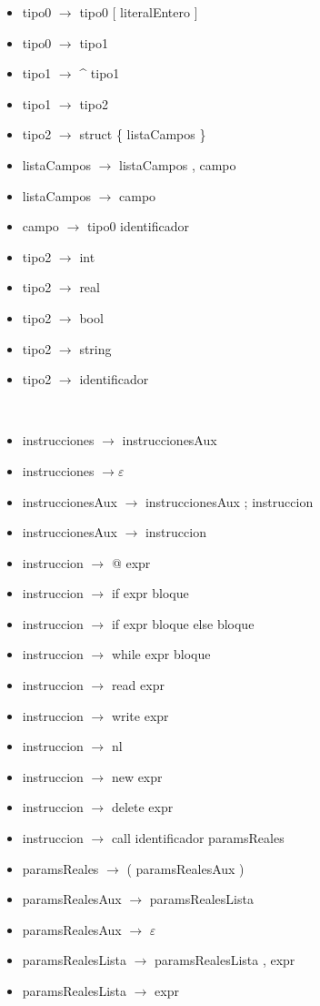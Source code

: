 \documentclass[11pt]{article}
\begin{document}
        \begin{itemize}
            \item tipo0 $\rightarrow$ tipo0 [ literalEntero ]
            \item tipo0 $\rightarrow$ tipo1
            \item tipo1 $\rightarrow$ \^{} tipo1
            \item tipo1 $\rightarrow$ tipo2
            \item tipo2 $\rightarrow$ struct \{ listaCampos \}
            \item listaCampos $\rightarrow$ listaCampos , campo
            \item listaCampos $\rightarrow$ campo
            \item campo $\rightarrow$ tipo0 identificador
            \item tipo2 $\rightarrow$ int
            \item tipo2 $\rightarrow$ real
            \item tipo2 $\rightarrow$ bool
            \item tipo2 $\rightarrow$ string
            \item tipo2 $\rightarrow$ identificador
        \end{itemize}
        \
        \begin{itemize}
            \item instrucciones $\rightarrow$ instruccionesAux
            \item instrucciones $\rightarrow \varepsilon$
            \item instruccionesAux $\rightarrow$ instruccionesAux ; instruccion 
            \item instruccionesAux $\rightarrow$ instruccion 
            \item instruccion  $\rightarrow$ @ expr
            \item instruccion  $\rightarrow$ if expr bloque
            \item instruccion  $\rightarrow$ if expr bloque else bloque
            \item instruccion  $\rightarrow$ while expr bloque
            \item instruccion  $\rightarrow$ read expr
            \item instruccion  $\rightarrow$ write expr
            \item instruccion  $\rightarrow$ nl
            \item instruccion  $\rightarrow$ new expr
            \item instruccion  $\rightarrow$ delete expr
            \item instruccion  $\rightarrow$ call identificador paramsReales
            \item paramsReales $\rightarrow$ ( paramsRealesAux )
            \item paramsRealesAux $\rightarrow$ paramsRealesLista
            \item paramsRealesAux $\rightarrow$ $\varepsilon$
            \item paramsRealesLista $\rightarrow$ paramsRealesLista , expr 
            \item paramsRealesLista $\rightarrow$ expr
        \end{itemize}
\end{document}
